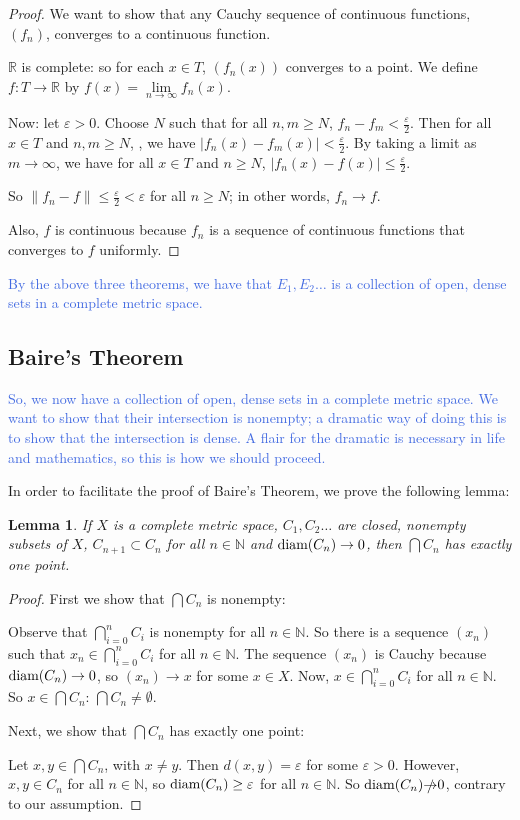 \documentclass{amsart}
\newcommand{\vep}{\varepsilon}
\newcommand{\N}{\mathbb{N}}
\newcommand{\R}{\mathbb{R}}
\newcommand{\diam}{\text{\rm diam}}
\newcommand{\colorcomment}[2]{\textcolor{#1}{#2}} %
\newcommand{\absval}[1]{\lvert #1 \rvert}
\newcommand{\norm}[1]{\|#1\|}
\newtheorem{lem}[thm]{Lemma}
\theoremstyle{definition}
\begin{document}
\begin{proof}
We want to show that any Cauchy sequence of continuous functions, $(f_n)$, converges to a continuous function.

$\R$ is complete: so for each $x \in T$, $(f_n(x))$ converges to a point. We define $f: T \to \R$ by $f(x) = \lim\limits_{n \to \infty} f_n(x)$.

Now: let $\vep >0$. Choose $N$ such that for all $n,m \geq N$, ${f_n-f_m} < \frac{\vep}{2}$. 
Then for all $x \in T$ and $n,m \geq N$, , we have $\absval{f_n(x) - f_m(x)} < \frac{\vep}{2}$.
By taking a limit as $m \to \infty$, we have for all $x \in T$ and $n \geq N$, $\absval{f_n(x) - f(x)} \leq \frac{\vep}{2}$.

So $\norm{f_n - f} \leq \frac{\vep}{2} < \vep$ for all $n \geq N$; in other words, $f_n \to f$.

Also, $f$ is continuous because $f_n$ is a sequence of continuous functions that converges to $f$ uniformly.

\end{proof}

\colorcomment{RoyalBlue}{By the above three theorems, we have that $E_1, E_2 \ldots$ is a collection of open, dense sets in a complete metric space.}

\subsection{Baire's Theorem}

\colorcomment{RoyalBlue}{So, we now have a collection of open, dense sets in a complete metric space. 
We want to show that their intersection is nonempty; a dramatic way of doing this is to show that the intersection is dense. 
A flair for the dramatic is necessary in life and mathematics, so this is how we should proceed.}

In order to facilitate the proof of Baire's Theorem, we prove the following lemma:

\begin{lem}
If $X$ is a complete metric space, $C_1, C_2 \ldots$ are closed, nonempty subsets of $X$, $C_{n+1} \subset C_n$ for all $n \in \N$ and $\diam(C_n) \to 0$, then $\bigcap C_n$ has exactly one point.
\end{lem}

\begin{proof}
First we show that $\bigcap C_n$ is nonempty: 

Observe that $\bigcap\limits_{i=0}^n C_i$ is nonempty for all $n \in \N$. 
So there is a sequence $(x_n)$ such that $x_n \in \bigcap\limits_{i=0}^n C_i$ for all $n \in \N$. 
The sequence $(x_n)$ is Cauchy because $\diam(C_n) \to 0$, so $(x_n) \to x$ for some $x \in X$.
Now, $x \in \bigcap\limits_{i=0}^n C_i$ for all $n \in \N$.
So $x \in \bigcap C_n$: $\bigcap C_n \neq \emptyset$.

Next, we show that $\bigcap C_n$ has exactly one point:

Let $x, y \in \bigcap C_n$, with $x \neq y$. 
Then $d(x,y) = \vep$ for some $\vep >0$. 
However, $x,y \in C_n$ for all $n \in \N$,
so $\diam(C_n) \geq \vep$ for all $n \in \N$. 
So $\diam(C_n) \slashed{\to} 0$, contrary to our assumption.
\end{proof}
\end{document}
